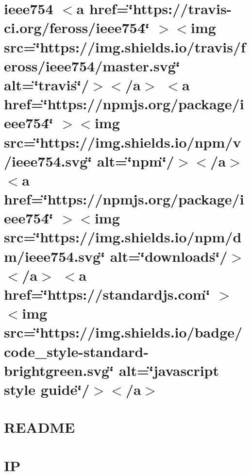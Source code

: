 \documentclass[twoside]{book}
\newcommand{\+}{\discretionary{\mbox{\scriptsize$\hookleftarrow$}}{}{}}
\begin{document}
\chapter{ieee754 \texorpdfstring{$<$}{<}a href=\char`\"{}https\+://travis-\/ci.\+org/feross/ieee754\char`\"{} \texorpdfstring{$>$}{>}\texorpdfstring{$<$}{<}img src=\char`\"{}https\+://img.\+shields.\+io/travis/feross/ieee754/master.\+svg\char`\"{} alt=\char`\"{}travis\char`\"{}/\texorpdfstring{$>$}{>}\texorpdfstring{$<$}{<}/a\texorpdfstring{$>$}{>} \texorpdfstring{$<$}{<}a href=\char`\"{}https\+://npmjs.\+org/package/ieee754\char`\"{} \texorpdfstring{$>$}{>}\texorpdfstring{$<$}{<}img src=\char`\"{}https\+://img.\+shields.\+io/npm/v/ieee754.\+svg\char`\"{} alt=\char`\"{}npm\char`\"{}/\texorpdfstring{$>$}{>}\texorpdfstring{$<$}{<}/a\texorpdfstring{$>$}{>} \texorpdfstring{$<$}{<}a href=\char`\"{}https\+://npmjs.\+org/package/ieee754\char`\"{} \texorpdfstring{$>$}{>}\texorpdfstring{$<$}{<}img src=\char`\"{}https\+://img.\+shields.\+io/npm/dm/ieee754.\+svg\char`\"{} alt=\char`\"{}downloads\char`\"{}/\texorpdfstring{$>$}{>}\texorpdfstring{$<$}{<}/a\texorpdfstring{$>$}{>} \texorpdfstring{$<$}{<}a href=\char`\"{}https\+://standardjs.\+com\char`\"{} \texorpdfstring{$>$}{>}\texorpdfstring{$<$}{<}img src=\char`\"{}https\+://img.\+shields.\+io/badge/code\+\_\+style-\/standard-\/brightgreen.\+svg\char`\"{} alt=\char`\"{}javascript style guide\char`\"{}/\texorpdfstring{$>$}{>}\texorpdfstring{$<$}{<}/a\texorpdfstring{$>$}{>}}
\label{md__c___users_vaishnavi_jadhav__desktop__developer_code_mean_stack_example_server_node_modules_ieee754__r_e_a_d_m_e}

\chapter{README}
\label{md__c___users_vaishnavi_jadhav__desktop__developer_code_mean_stack_example_server_node_modules_inherits__r_e_a_d_m_e}

\chapter{IP}
\label{md__c___users_vaishnavi_jadhav__desktop__developer_code_mean_stack_example_server_node_modules_ip__r_e_a_d_m_e}

\end{document}
